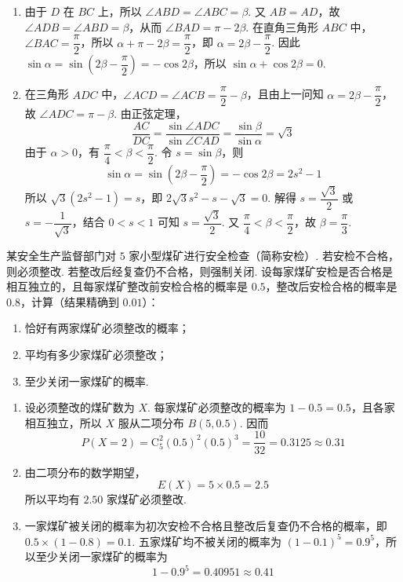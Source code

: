 \begin{solution}
\begin{enumerate}
\item 由于 \(D\) 在 \(BC\) 上，所以 \(\angle ABD=\angle ABC=\beta\). 又 \(AB=AD\)，故 \(\angle ADB=\angle ABD=\beta\)，从而 \(\angle BAD=\pi-2\beta\). 在直角三角形 \(ABC\) 中，\(\angle BAC=\dfrac{\pi}{2}\)，所以 \(\alpha+\pi-2\beta=\dfrac{\pi}{2}\)，即 \(\alpha=2\beta-\dfrac{\pi}{2}\). 因此 \(\sin\alpha=\sin\left(2\beta-\dfrac{\pi}{2}\right)=-\cos2\beta\)，所以 \(\sin\alpha+\cos2\beta=0\).

\item 在三角形 \(ADC\) 中，\(\angle ACD=\angle ACB=\dfrac{\pi}{2}-\beta\)，且由上一问知 \(\alpha=2\beta-\dfrac{\pi}{2}\)，故 \(\angle ADC=\pi-\beta\). 由正弦定理，
\[
\frac{AC}{DC}=\frac{\sin\angle ADC}{\sin\angle CAD}=\frac{\sin\beta}{\sin\alpha}=\sqrt{3}
\]
由于 \(\alpha>0\)，有 \(\dfrac{\pi}{4}<\beta<\dfrac{\pi}{2}\). 令 \(s=\sin\beta\)，则
\[
\sin\alpha=\sin\left(2\beta-\frac{\pi}{2}\right)=-\cos2\beta=2s^{2}-1
\]
所以 \(\sqrt{3}(2s^{2}-1)=s\)，即 \(2\sqrt{3}s^{2}-s-\sqrt{3}=0\). 解得 \(s=\dfrac{\sqrt{3}}{2}\) 或 \(s=-\dfrac{1}{\sqrt{3}}\)，结合 \(0<s<1\) 可知 \(s=\dfrac{\sqrt{3}}{2}\). 又 \(\dfrac{\pi}{4}<\beta<\dfrac{\pi}{2}\)，故 \(\beta=\dfrac{\pi}{3}\).
\end{enumerate}
\end{solution}

\begin{problem}
某安全生产监督部门对 \(5\) 家小型煤矿进行安全检查（简称安检）. 若安检不合格，则必须整改. 若整改后经复查仍不合格，则强制关闭. 设每家煤矿安检是否合格是相互独立的，且每家煤矿整改前安检合格的概率是 \(0.5\)，整改后安检合格的概率是 \(0.8\)，计算（结果精确到 \(0.01\)）：

\begin{enumerate}
\item 恰好有两家煤矿必须整改的概率；
\item 平均有多少家煤矿必须整改；
\item 至少关闭一家煤矿的概率.
\end{enumerate}
\end{problem}

\begin{solution}
\begin{enumerate}
\item 设必须整改的煤矿数为 \(X\). 每家煤矿必须整改的概率为 \(1-0.5=0.5\)，且各家相互独立，所以 \(X\) 服从二项分布 \(B\left(5,0.5\right)\). 因而
\[
P(X=2)=\mathrm C_{5}^{2}(0.5)^{2}(0.5)^{3}=\frac{10}{32}=0.3125\approx0.31
\]

\item 由二项分布的数学期望，
\[
E(X)=5\times0.5=2.5
\]
所以平均有 \(2.50\) 家煤矿必须整改.

\item 一家煤矿被关闭的概率为初次安检不合格且整改后复查仍不合格的概率，即 \(0.5\times(1-0.8)=0.1\). 五家煤矿均不被关闭的概率为 \((1-0.1)^{5}=0.9^{5}\)，所以至少关闭一家煤矿的概率为
\[
1-0.9^{5}=0.40951\approx0.41
\]
\end{enumerate}
\end{solution}

